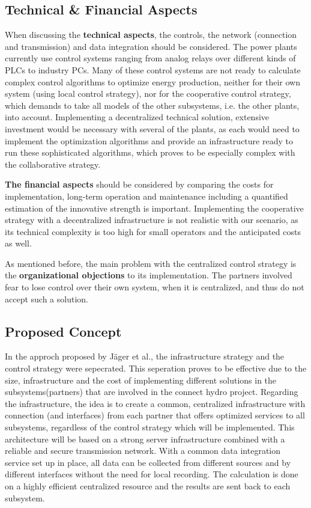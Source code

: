 \subsection{Technical \& Financial Aspects}
When discussing the \textbf{technical aspects}, the controls, the network (connection and transmission) and data integration should be considered.\cite{SEIT2017} The power plants currently use control systems ranging from analog relays over different kinds of PLCs to industry PCs. Many of these control systems are not ready to calculate complex control algorithms to optimize energy production, neither for their own system (using local control strategy), nor for the cooperative control strategy, which demands to take all models of the other subsystems, i.e. the other plants, into account.\cite{SEIT2017} Implementing a decentralized technical solution, extensive investment would be necessary with several of the plants, as each would need to implement the optimization algorithms and provide an infrastructure ready to run these sophisticated algorithms, which proves to be especially complex with the collaborative strategy.\cite{SEIT2017} 

\textbf{The financial aspects} should be considered by comparing the costs for implementation, long-term operation and maintenance including a quantified estimation of the innovative strength is important. Implementing the cooperative strategy with a decentralized infrastructure is not realistic with our scenario, as its technical complexity is too high for small operators and the anticipated costs as well.\cite{SEIT2017}

As mentioned before, the main problem with the centralized control strategy is the \textbf{organizational objections} to its implementation. The partners involved fear to lose control over their own system, when it is centralized, and thus do not accept such a solution.\cite{stewart2010cooperative}
\subsection{Proposed Concept}
In the approch proposed by Jäger et al.\cite{SEIT2017}, the infrastructure strategy and the control strategy were sepecrated. This seperation proves to be effective due to the size, infrastructure and the cost of implementing different solutions in the subsystems(partners) that are involved in the connect hydro project. Regarding the infrastructure, the idea is to create a common, centralized infrastructure with connection (and interfaces) from each
partner that offers optimized services to all subsystems, regardless of the control strategy which will be implemented. This architecture will be based on a strong server infrastructure combined with a reliable and secure transmission network.\cite{SEIT2017} With a common data integration service set up in place, all data can be collected from different sources and by different interfaces without the need for local recording. The calculation is done on a highly efficient centralized resource and the results are sent back to each subsystem.

